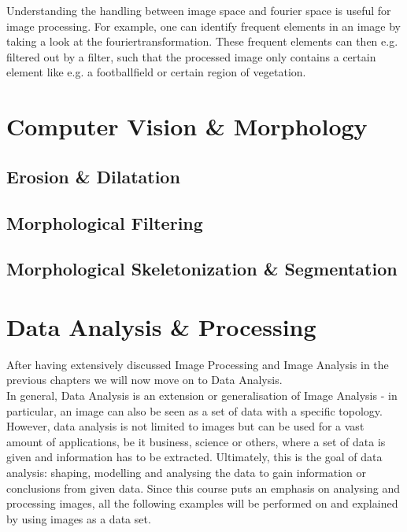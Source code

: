Understanding the handling between image space and fourier space is useful for image processing. For example, one can identify frequent elements in an image by taking a look at the fouriertransformation. These frequent elements can then e.g. filtered out by a filter, such that the processed image only contains a certain element like e.g. a footballfield or certain region of vegetation.



\section{Computer Vision \& Morphology}

\subsection{Erosion \& Dilatation}

\subsection{Morphological Filtering}

\subsection{Morphological Skeletonization \& Segmentation}


\section{Data Analysis \& Processing}
After having extensively discussed Image Processing and Image Analysis in the previous chapters we will now move on to Data Analysis. \\In general, Data Analysis is an extension or generalisation of Image Analysis - in particular, an image can also be seen as a set of data with a specific topology. However, data analysis is not limited to images but can be used for a vast amount of applications, be it business, science or others, where a set of data is given and information has to be extracted. Ultimately, this is the goal of data analysis: shaping, modelling and analysing the data to gain information or conclusions from given data.
Since this course puts an emphasis on analysing and processing images, all the following examples will be performed on and explained by using images as a data set.

